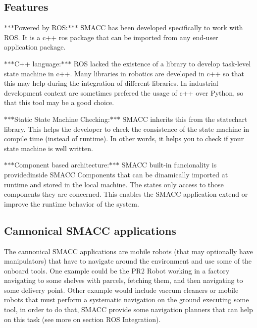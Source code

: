  

\subsection*{Features}


\begin{DoxyItemize}
\item $\ast$$\ast$$\ast$\-Powered by R\-O\-S\-:$\ast$$\ast$$\ast$ S\-M\-A\-C\-C has been developed specifically to work with R\-O\-S. It is a c++ ros package that can be imported from any end-\/user application package.
\item $\ast$$\ast$$\ast$\-C++ language\-:$\ast$$\ast$$\ast$ R\-O\-S lacked the existence of a library to develop task-\/level state machine in c++. Many libraries in robotics are developed in c++ so that this may help during the integration of different libraries. In industrial development context are sometimes prefered the usage of c++ over Python, so that this tool may be a good choice.
\item $\ast$$\ast$$\ast$\-Static State Machine Checking\-:$\ast$$\ast$$\ast$ S\-M\-A\-C\-C inherits this from the statechart library. This helps the developer to check the consistence of the state machine in compile time (instead of runtime). In other words, it helps you to check if your state machine is well written.
\item $\ast$$\ast$$\ast$\-Component based architecture\-:$\ast$$\ast$$\ast$ S\-M\-A\-C\-C built-\/in funcionality is providedinside S\-M\-A\-C\-C Components that can be dinamically imported at runtime and stored in the local machine. The states only access to those components they are concerned. This enables the S\-M\-A\-C\-C application extend or improve the runtime behavior of the system.
\end{DoxyItemize}

\subsection*{Cannonical S\-M\-A\-C\-C applications}

The cannonical S\-M\-A\-C\-C applications are mobile robots (that may optionally have manipulators) that have to navigate around the environment and use some of the onboard tools. One example could be the P\-R2 Robot working in a factory navigating to some shelves with parcels, fetching them, and then navigating to some delivery point. Other example would include vaccum cleaners or mobile robots that must perform a systematic navigation on the ground executing some tool, in order to do that, S\-M\-A\-C\-C provide some navigation planners that can help on this task (see more on section R\-O\-S Integration).

